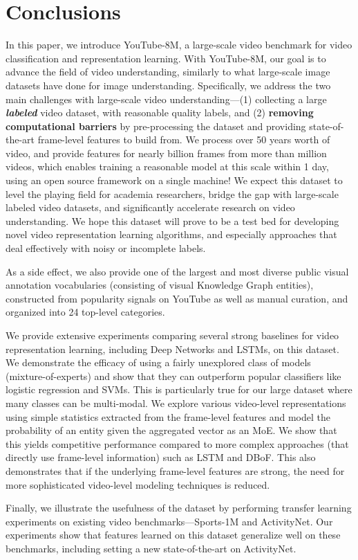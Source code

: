 \documentclass{sig-alternate-05-2015}
\begin{document}
 
\section{Conclusions}
\label{sec:conclusions}
In this paper, we introduce YouTube-8M, a large-scale video benchmark for video classification and representation learning.
With YouTube-8M, our goal is to advance the field of video understanding, similarly to what large-scale image datasets have
done for image understanding. Specifically, we address the two main challenges with large-scale video understanding---(1) collecting
a large \textbf{\em labeled} video dataset, with reasonable quality labels, and (2) \textbf{removing computational barriers} by pre-processing the dataset and providing state-of-the-art frame-level features to build from. We process over 50 years worth of video, and provide features for
nearly  billion frames from more than  million videos, which enables training a reasonable model at this scale within 1 day,
using an open source framework on a single machine! We expect this dataset to level the playing field for academia researchers,
bridge the gap with large-scale labeled video datasets, and significantly accelerate research on video understanding.
We hope this dataset will prove to be a test bed for developing novel video representation learning algorithms,
and especially approaches that deal effectively with noisy or incomplete labels.

As a side effect, we also provide one of the largest and most diverse public visual annotation vocabularies
(consisting of  visual Knowledge Graph entities), constructed from popularity signals on YouTube
as well as manual curation, and organized into 24 top-level categories.


We provide extensive experiments comparing several strong baselines for video representation learning, including
Deep Networks and LSTMs, on this dataset.
We demonstrate the efficacy of using a fairly unexplored class of models (mixture-of-experts) and show that they can outperform popular classifiers like logistic regression and SVMs. This is particularly true for our large dataset where many classes can be multi-modal. We explore various video-level representations using simple statistics extracted from the frame-level features and model the probability of an entity given the aggregated vector as an MoE. We show that this yields competitive performance compared to more complex approaches (that directly use frame-level information) such as LSTM and DBoF. This also demonstrates that if the underlying frame-level features are strong, the need for more sophisticated video-level modeling techniques is reduced.

Finally, we illustrate the usefulness of the dataset by performing transfer learning
experiments on existing video benchmarks---Sports-1M and ActivityNet. Our experiments show that features learned
on this dataset generalize well on these benchmarks, including setting a new state-of-the-art on ActivityNet.
 


\end{document}
